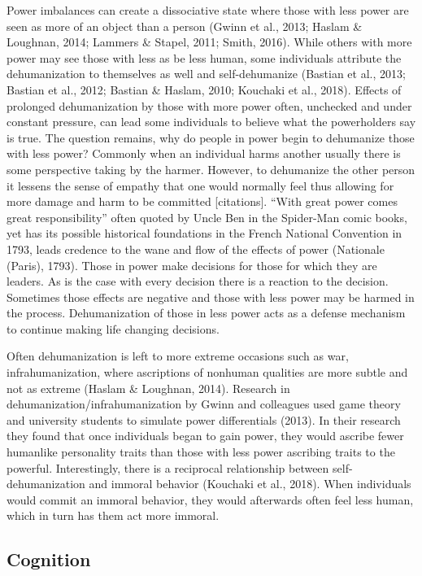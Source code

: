 \documentclass[
  english,
  donotrepeattitle,doc, 12pt, a4paper,floatsintext]{apa7}
\begin{document}
Power imbalances can create a dissociative state where those with less power are seen as more of an object than a person (Gwinn et al., 2013; Haslam \& Loughnan, 2014; Lammers \& Stapel, 2011; Smith, 2016). While others with more power may see those with less as be less human, some individuals attribute the dehumanization to themselves as well and self-dehumanize (Bastian et al., 2013; Bastian et al., 2012; Bastian \& Haslam, 2010; Kouchaki et al., 2018). Effects of prolonged dehumanization by those with more power often, unchecked and under constant pressure, can lead some individuals to believe what the powerholders say is true. The question remains, why do people in power begin to dehumanize those with less power? Commonly when an individual harms another usually there is some perspective taking by the harmer. However, to dehumanize the other person it lessens the sense of empathy that one would normally feel thus allowing for more damage and harm to be committed {[}citations{]}. ``With great power comes great responsibility'' often quoted by Uncle Ben in the Spider-Man comic books, yet has its possible historical foundations in the French National Convention in 1793, leads credence to the wane and flow of the effects of power (Nationale (Paris), 1793). Those in power make decisions for those for which they are leaders. As is the case with every decision there is a reaction to the decision. Sometimes those effects are negative and those with less power may be harmed in the process. Dehumanization of those in less power acts as a defense mechanism to continue making life changing decisions.

Often dehumanization is left to more extreme occasions such as war, infrahumanization, where ascriptions of nonhuman qualities are more subtle and not as extreme (Haslam \& Loughnan, 2014). Research in dehumanization/infrahumanization by Gwinn and colleagues used game theory and university students to simulate power differentials (2013). In their research they found that once individuals began to gain power, they would ascribe fewer humanlike personality traits than those with less power ascribing traits to the powerful. Interestingly, there is a reciprocal relationship between self-dehumanization and immoral behavior (Kouchaki et al., 2018). When individuals would commit an immoral behavior, they would afterwards often feel less human, which in turn has them act more immoral.

\hypertarget{cognition}{%
\subsection{Cognition}\label{cognition}}
\end{document}
